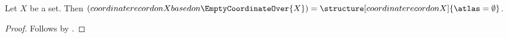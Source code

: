 


\begin{proposition}\label{discovery_result}
    Let $X$ be a set.
    Then $(coordinate record on X based on \EmptyCoordinateOver{X})=
        \structure[coordinate record on X]{\atlas=\emptyset}$.
\end{proposition}
\begin{proof}
    Follows by .
\end{proof}
